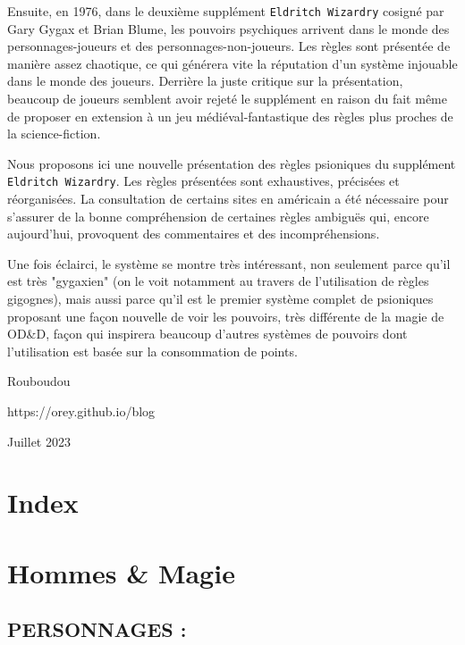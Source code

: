 \documentclass[12pt]{article}
\begin{document}
Ensuite, en 1976, dans le deuxième supplément \texttt{Eldritch Wizardry} cosigné par Gary Gygax et Brian Blume, les pouvoirs psychiques arrivent dans le monde des personnages-joueurs et des personnages-non-joueurs. Les règles sont présentée de manière assez chaotique, ce qui générera vite la réputation d'un système injouable dans le monde des joueurs. Derrière la juste critique sur la présentation, beaucoup de joueurs semblent avoir rejeté le supplément en raison du fait même de proposer en extension à un jeu médiéval-fantastique des règles plus proches de la science-fiction.

Nous proposons ici une nouvelle présentation des règles psioniques du supplément \texttt{Eldritch Wizardry}. Les règles présentées sont exhaustives, précisées et réorganisées. La consultation de certains sites en américain a été nécessaire pour s'assurer de la bonne compréhension de certaines règles ambiguës qui, encore aujourd'hui, provoquent des commentaires et des incompréhensions.

Une fois éclairci, le système se montre très intéressant, non seulement parce qu'il est très "gygaxien" (on le voit notamment au travers de l'utilisation de règles gigognes), mais aussi parce qu'il est le premier système complet de psioniques proposant une façon nouvelle de voir les pouvoirs, très différente de la magie de OD\&D, façon qui inspirera beaucoup d'autres systèmes de pouvoirs dont l'utilisation est basée sur la consommation de points.

\vspace{1cm}

\noindent Rouboudou

\noindent https://orey.github.io/blog

\noindent Juillet 2023

\newpage

\section*{Index}

\newpage

\section*{Hommes \& Magie}

\subsection*{{\normalsize PERSONNAGES :}}
\end{document}
